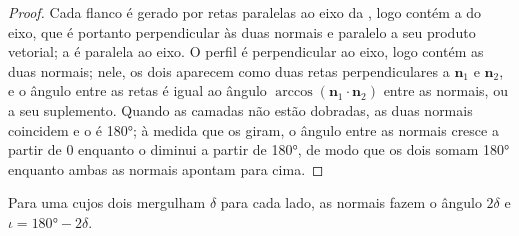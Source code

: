 \begin{proof}
Cada flanco é gerado por retas paralelas ao eixo da , logo contém a  do eixo, que é portanto perpendicular às duas normais e paralelo a seu produto vetorial; a  é paralela ao eixo. O perfil é perpendicular ao eixo, logo contém as duas normais; nele, os dois  aparecem como duas retas perpendiculares a $\mathbf n_1$ e $\mathbf n_2$, e o ângulo entre as retas é igual ao ângulo $\arccos(\mathbf n_1\cdot\mathbf n_2)$ entre as normais, ou a seu suplemento. Quando as camadas não estão dobradas, as duas normais coincidem e o  é \ang{180}; à medida que os  giram, o ângulo entre as normais cresce a partir de $0$ enquanto o  diminui a partir de \ang{180}, de modo que os dois somam \ang{180} enquanto ambas as normais apontam para cima.
\end{proof}

Para uma  cujos dois  mergulham $\delta$ para cada lado, as normais
fazem o ângulo $2\delta$ e $\iota = \ang{180} - 2\delta$.


